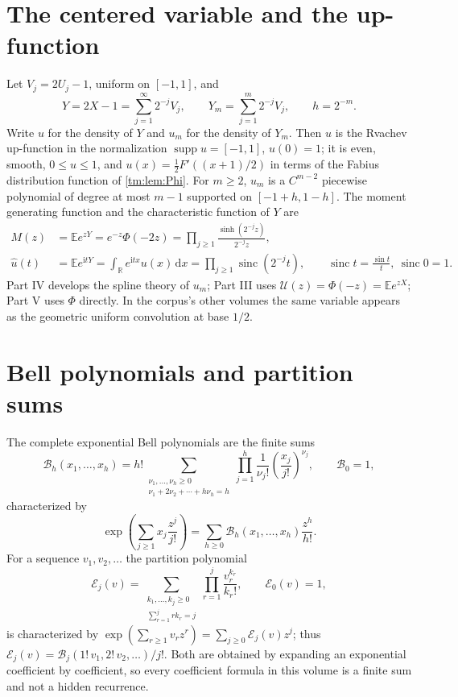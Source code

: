 \documentclass[11pt,a4paper,oneside,openany]{book}
\numberwithin{equation}{chapter}
\theoremstyle{definition}
\theoremstyle{remark}
\newcommand{\R}{\mathbb R}
\newcommand{\E}{\mathbb E}
\newcommand{\dd}{\,\mathrm d}
\newcommand{\ii}{\mathrm i}
\DeclareMathOperator{\supp}{supp}
\DeclareMathOperator{\sinc}{sinc}
\newcommand{\B}{\mathcal B}
\newcommand{\Up}{\mathcal U}
\newcommand{\Part}[1]{\substack{k_1,\ldots,k_{#1}\geq0\\\sum_{r=1}^{#1}rk_r=#1}}
\begin{document}
\section{The centered variable and the up-function}
Let $V_j=2U_j-1$, uniform on $[-1,1]$, and
\begin{equation}\label{tm:eq:Y}
 Y=2X-1=\sum_{j=1}^{\infty}2^{-j}V_j,\qquad
 Y_m=\sum_{j=1}^{m}2^{-j}V_j,\qquad h=2^{-m}.
\end{equation}
Write $u$ for the density of $Y$ and $u_m$ for the density of $Y_m$. Then
$u$ is the Rvachev up-function in the normalization $\supp u=[-1,1]$,
$u(0)=1$; it is even, smooth, $0\le u\le1$, and $u(x)=\tfrac12F'((x+1)/2)$
in terms of the Fabius distribution function of
\cref{tm:lem:Phi}. For $m\ge2$, $u_m$ is a $C^{m-2}$ piecewise polynomial of
degree at most $m-1$ supported on $[-1+h,1-h]$. The moment generating
function and the characteristic function of $Y$ are
\begin{align}
 M(z)&=\E e^{zY}=e^{-z}\Phi(-2z)
 =\prod_{j\ge1}\frac{\sinh(2^{-j}z)}{2^{-j}z},\label{tm:eq:M}\\
 \widehat u(t)&=\E e^{\ii tY}=\int_{\R}e^{\ii tx}u(x)\dd x
 =\prod_{j\ge1}\sinc(2^{-j}t),\qquad
 \sinc t=\frac{\sin t}t,\ \sinc0=1.\label{tm:eq:sinc-product}
\end{align}
Part IV develops the spline theory of $u_m$; Part III uses
$\Up(z)=\Phi(-z)=\E e^{zX}$; Part V uses $\Phi$ directly. In the corpus's
other volumes the same variable appears as the geometric uniform convolution
at base $1/2$.

\section{Bell polynomials and partition sums}
The complete exponential Bell polynomials are the finite sums
\begin{equation}\label{tm:eq:Bell}
 \B_h(x_1,\ldots,x_h)
 =h!\!\sum_{\substack{\nu_1,\ldots,\nu_h\ge0\\
                       \nu_1+2\nu_2+\cdots+h\nu_h=h}}
 \prod_{j=1}^h\frac1{\nu_j!}\left(\frac{x_j}{j!}\right)^{\nu_j},
 \qquad\B_0=1,
\end{equation}
characterized by
\begin{equation}\label{tm:eq:BellGF}
 \exp\left(\sum_{j\ge1}x_j\frac{z^j}{j!}\right)
 =\sum_{h\ge0}\B_h(x_1,\ldots,x_h)\frac{z^h}{h!}.
\end{equation}
For a sequence $v_1,v_2,\ldots$ the partition polynomial
\begin{equation}\label{tm:eq:partition-polynomial}
 \mathcal E_j(v)=\sum_{\Part{j}}\prod_{r=1}^j\frac{v_r^{k_r}}{k_r!},
 \qquad\mathcal E_0(v)=1,
\end{equation}
is characterized by $\exp(\sum_{r\ge1}v_rz^r)=\sum_{j\ge0}\mathcal E_j(v)z^j$;
thus $\mathcal E_j(v)=\B_j(1!\,v_1,2!\,v_2,\ldots)/j!$. Both are obtained by
expanding an exponential coefficient by coefficient, so every coefficient
formula in this volume is a finite sum and not a hidden recurrence.
\end{document}
